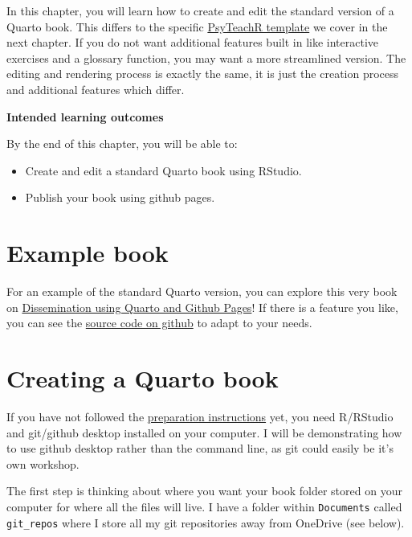 \documentclass[
  letterpaper,
  DIV=11,
  numbers=noendperiod]{scrreprt}
\begin{document}
In this chapter, you will learn how to create and edit the standard
version of a Quarto book. This differs to the specific
\hyperref[psyteachr_book]{PsyTeachR template} we cover in the next
chapter. If you do not want additional features built in like
interactive exercises and a glossary function, you may want a more
streamlined version. The editing and rendering process is exactly the
same, it is just the creation process and additional features which
differ.

\textbf{Intended learning outcomes}

By the end of this chapter, you will be able to:

\begin{itemize}
\item
  Create and edit a standard Quarto book using RStudio.
\item
  Publish your book using github pages.
\end{itemize}

\section{Example book}\label{example-book}

For an example of the standard Quarto version, you can explore this very
book on
\href{https://bartlettje.github.io/dissemination_quarto/}{Dissemination
using Quarto and Github Pages}! If there is a feature you like, you can
see the \href{https://github.com/BartlettJE/dissemination_quarto}{source
code on github} to adapt to your needs.

\section{Creating a Quarto book}\label{creating-a-quarto-book}

If you have not followed the \hyperref[workshop_prep]{preparation
instructions} yet, you need R/RStudio and git/github desktop installed
on your computer. I will be demonstrating how to use github desktop
rather than the command line, as git could easily be it's own workshop.

The first step is thinking about where you want your book folder stored
on your computer for where all the files will live. I have a folder
within \texttt{Documents} called \texttt{git\_repos} where I store all
my git repositories away from OneDrive (see below).
\end{document}

